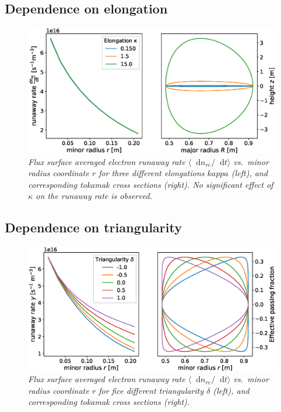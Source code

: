 \documentclass[11pt,a4paper]{article}
\newcommand*\diff{\mathop{}\!\mathrm{d}}
\begin{document}
\subsection{Dependence on elongation}
\begin{figure}[H]
    \centering
    \includegraphics[width=\textwidth]{figs/elongation.eps}
    \caption{\textit{Flux surface averaged electron runaway rate $\langle\diff{n}_{re}/\diff{t}\rangle$ vs.\ minor radius coordinate $r$ for three different elongations $kappa$ (left), and corresponding tokamak cross sections (right).
    No significant effect of $\kappa$ on the runaway rate is observed.}}
    \label{fig:elongation}
\end{figure}

\subsection{Dependence on triangularity}
\begin{figure}[H]
    \centering
    \includegraphics[width=\textwidth]{figs/triangularity.eps}
    \caption{\textit{Flux surface averaged electron runaway rate $\langle\diff{n}_{re}/\diff{t}\rangle$ vs.\ minor radius coordinate $r$ for fice different triangularity $\delta$ (left), and corresponding tokamak cross sections (right).}}
    \label{fig:elongation}
\end{figure}
\end{document}
